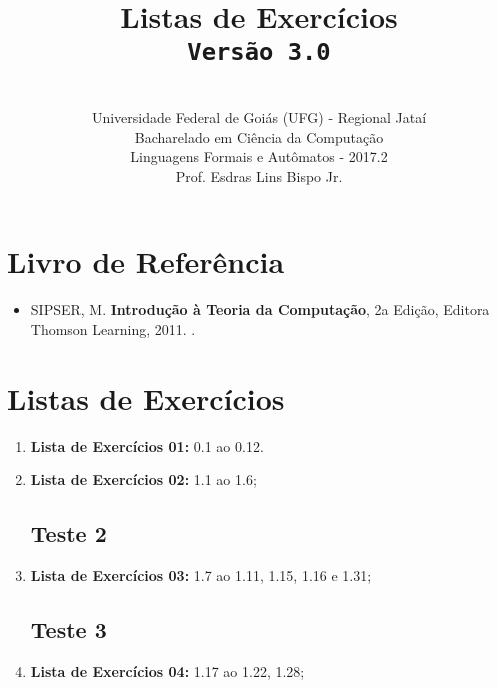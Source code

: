 \documentclass[12pt,a4paper,oneside]{article}
\author{\\Universidade Federal de Goiás (UFG) - Regional Jataí\\Bacharelado em Ciência da Computação \\Linguagens Formais e Autômatos - 2017.2 \\Prof. Esdras Lins Bispo Jr.}
\date{}
\title{
	\sc \huge Listas de Exercícios
	\\{\tt Versão 3.0}
}
\begin{document}
\maketitle

\section{Livro de Referência}
	\begin{itemize}
		\item SIPSER, M. {\bf Introdução à Teoria da Computação}, 2a Edição, Editora Thomson Learning, 2011. \color{blue}{\bf Código Bib.: [004 SIP/int]}.
	\end{itemize}
	
\section{Listas de Exercícios}

\begin{enumerate}

	\subsection{Teste 1}
	\item[] {\bf Lista de Exercícios 01:} 0.1 ao 0.12.
	\item[] {\bf Lista de Exercícios 02:} 1.1 ao 1.6;
	\subsection{Teste 2}
	\item[] {\bf Lista de Exercícios 03:} 1.7 ao 1.11, 1.15, 1.16 e 1.31; 
	\subsection{Teste 3}
	\item[] {\bf Lista de Exercícios 04:} 1.17 ao 1.22, 1.28;
	
\end{enumerate}
\end{document}
